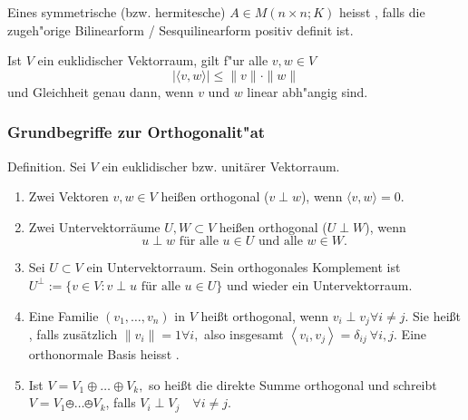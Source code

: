 \documentclass[9pt, a4paper, twocolumn, landscape]{article}
\begin{document}
\begin{remark}
Eines symmetrische (bzw. hermitesche)  $A \in M( n \times n; K)$ heisst , falls die zugeh"orige Bilinearform / Sesquilinearform positiv definit ist. 
\end{remark}

\begin{theorem}  Ist $V$ ein euklidischer Vektorraum, gilt f"ur alle $v, w \in V$
\begin{equation*}
|\langle v, w\rangle| \leq\|v\| \cdot\|w\|
\end{equation*}
und Gleichheit genau dann, wenn $v$ und $w$ linear abh"angig sind.
\end{theorem}

\subsubsection{Grundbegriffe zur Orthogonalit"at}
\begin{definition}
Definition. Sei \(V\) ein euklidischer bzw. unitärer Vektorraum.
\begin{enumerate}
\item Zwei Vektoren \(v, w \in V\) heißen orthogonal ($v \perp w$), wenn $\langle v, w\rangle= 0.$
\item Zwei Untervektorräume \(U, W \subset V\) heißen orthogonal ($U \perp W$), wenn
\begin{equation*}
u \perp w \text { für alle } u \in U \text { und alle } w \in W \text {. }
\end{equation*}
\item Sei \(U \subset V\) ein Untervektorraum. Sein orthogonales Komplement ist \\
$U^{\perp}:=\{v \in V: v \perp u \text { für alle } u \in U\}$ und wieder ein Untervektorraum.
\item Eine Familie \(\left(v_{1}, \ldots, v_{n}\right)\) in \(V\) heißt orthogonal, wenn
$v_{i} \perp v_{j} \forall i \neq j.$
Sie heißt , falls zusätzlich $
\|v_i\| = 1 \forall i,
$ also insgesamt $\left\langle v_{i}, v_{j}\right\rangle=\delta_{i j} \ \forall i, j.$
Eine orthonormale Basis heisst .
\item Ist \(V=V_{1} \oplus \ldots \oplus V_{k},\) so heißt die direkte Summe orthogonal und schreibt $V=V_{1} \obot \ldots \obot V_{k}$, falls
$V_{i} \perp V_{j} \quad \forall i \neq j.$
\end{enumerate}
\end{definition}
\end{document}
